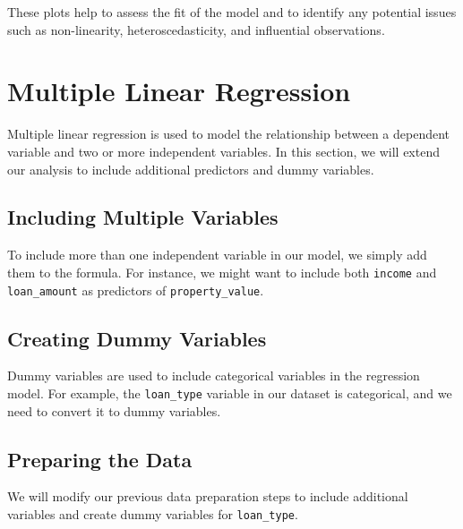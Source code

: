 \documentclass[
]{book}
\begin{document}
These plots help to assess the fit of the model and to identify any potential issues such as non-linearity, heteroscedasticity, and influential observations.

\hypertarget{multiple-linear-regression}{%
\section{Multiple Linear Regression}\label{multiple-linear-regression}}

Multiple linear regression is used to model the relationship between a dependent variable and two or more independent variables. In this section, we will extend our analysis to include additional predictors and dummy variables.

\hypertarget{including-multiple-variables}{%
\subsection{Including Multiple Variables}\label{including-multiple-variables}}

To include more than one independent variable in our model, we simply add them to the formula. For instance, we might want to include both \texttt{income} and \texttt{loan\_amount} as predictors of \texttt{property\_value}.

\hypertarget{creating-dummy-variables}{%
\subsection{Creating Dummy Variables}\label{creating-dummy-variables}}

Dummy variables are used to include categorical variables in the regression model. For example, the \texttt{loan\_type} variable in our dataset is categorical, and we need to convert it to dummy variables.

\hypertarget{preparing-the-data-1}{%
\subsection{Preparing the Data}\label{preparing-the-data-1}}

We will modify our previous data preparation steps to include additional variables and create dummy variables for \texttt{loan\_type}.
\end{document}
